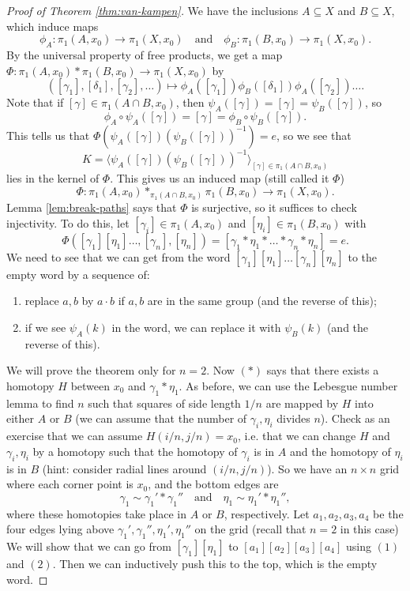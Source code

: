 \begin{proof}[Proof of Theorem \ref{thm:van-kampen}]
  We have the inclusions $A \subseteq X$ and
  $B \subseteq X$, which induce maps
  \[
    \phi_A : \pi_1(A, x_0) \to \pi_1(X, x_0)
    \quad \text{and} \quad
    \phi_B : \pi_1(B, x_0) \to \pi_1(X, x_0).
  \]
  By the universal property of free products, we
  get a map $\Phi : \pi_1(A, x_0) * \pi_1(B, x_0) \to \pi_1(X, x_0)$ by
  \[
    ([\gamma_1], [\delta_1], [\gamma_2], \dots)
    \mapsto \phi_A([\gamma_1]) \phi_B([\delta_1]) \phi_A([\gamma_2]) \dots.
  \]
  Note that if $[\gamma] \in \pi_1(A \cap B, x_0)$, then
  $\psi_A([\gamma]) = [\gamma] = \psi_B([\gamma])$, so
  \[
    \phi_A \circ \psi_A([\gamma]) =
    [\gamma] = \phi_B \circ \psi_B([\gamma]).
  \]
  This tells us that $\Phi(\psi_A ([\gamma]) (\psi_B ([\gamma]))^{-1}) = e$,
  so we see that
  \[
    K = \langle \psi_A([\gamma]) (\psi_B([\gamma]))^{-1}\rangle_{[\gamma] \in \pi_1(A \cap B, x_0)}
  \]
  lies in the kernel of $\Phi$. This gives us an induced
  map (still called it $\Phi$)
  \[
    \Phi : \pi_1(A, x_0) *_{\pi_1(A \cap B, x_0)} \pi_1(B, x_0) \to \pi_1(X, x_0).
  \]
  Lemma \ref{lem:break-paths} says that $\Phi$ is
  surjective, so it suffices to check injectivity.
  To do this, let
  $[\gamma_i] \in \pi_1(A, x_0)$ and $[\eta_i] \in \pi_1(B, x_0)$
  with
  \[
    \Phi([\gamma_1] [\eta_1] \dots, [\gamma_n], [\eta_n])
    = [\gamma_1 * \eta_1 * \dots * \gamma_n * \eta_n] = e. \tag{$*$}
  \]
  We need to see that we can get from the word
  $[\gamma_1] [\eta_1] \dots [\gamma_n] [\eta_n]$ to the
  empty word by a sequence of:
  \begin{enumerate}
    \item replace $a, b$ by $a \cdot b$ if $a, b$ are
      in the same group (and the reverse of this);
    \item if we see $\psi_A(k)$ in the word, we can
      replace it with $\psi_B(k)$ (and the reverse of
      this).
  \end{enumerate}
  We will prove the theorem only for $n = 2$.
  Now $(*)$ says that there exists a homotopy
  $H$ between $x_0$ and $\gamma_1 * \eta_1$.
  As before, we can use the Lebesgue number lemma
  to find $n$ such that squares of side length
  $1 / n$ are mapped by $H$ into either $A$ or $B$
  (we can assume that the number of $\gamma_i, \eta_i$
  divides $n$). Check as an exercise that we can assume
  $H(i / n, j / n) = x_0$, i.e. that we can change
  $H$ and $\gamma_i, \eta_i$ by a homotopy such that
  the homotopy of $\gamma_i$ is in $A$ and the
  homotopy of $\eta_i$ is in $B$ (hint: consider
  radial lines around $(i / n, j / n)$). So we have
  an $n \times n$ grid where each corner point is
  $x_0$, and the bottom edges are
  \[
    \gamma_1 \sim \gamma_1' * \gamma_1''
    \quad \text{and} \quad
    \eta_1 \sim \eta_1' * \eta_1'',
  \]
  where these homotopies take place in $A$ or $B$,
  respectively. Let $a_1, a_2, a_3, a_4$ be the four
  edges lying above $\gamma_1', \gamma_1'', \eta_1', \eta_1''$
  on the grid (recall that $n = 2$ in this case)
  We will show that we can go from
  $[\gamma_1] [\eta_1]$ to $[a_1] [a_2] [a_3] [a_4]$
  using $(1)$ and $(2)$. Then we can inductively push
  this to the top, which is the empty word.


\end{proof}
